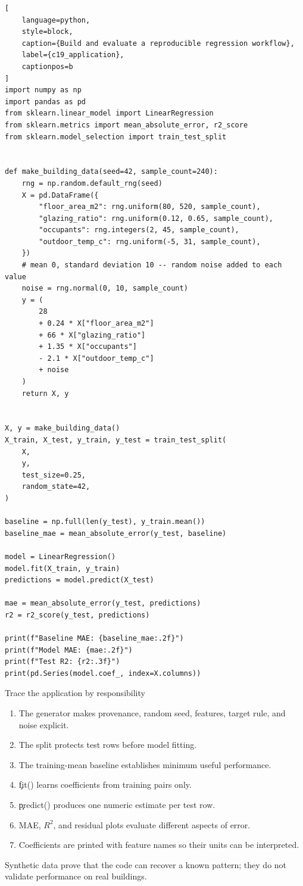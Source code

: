 \begin{lstlisting}[
    language=python,
    style=block,
    caption={Build and evaluate a reproducible regression workflow},
    label={c19_application},
    captionpos=b
]
import numpy as np
import pandas as pd
from sklearn.linear_model import LinearRegression
from sklearn.metrics import mean_absolute_error, r2_score
from sklearn.model_selection import train_test_split


def make_building_data(seed=42, sample_count=240):
    rng = np.random.default_rng(seed)
    X = pd.DataFrame({
        "floor_area_m2": rng.uniform(80, 520, sample_count),
        "glazing_ratio": rng.uniform(0.12, 0.65, sample_count),
        "occupants": rng.integers(2, 45, sample_count),
        "outdoor_temp_c": rng.uniform(-5, 31, sample_count),
    })
    # mean 0, standard deviation 10 -- random noise added to each value
    noise = rng.normal(0, 10, sample_count)
    y = (
        28
        + 0.24 * X["floor_area_m2"]
        + 66 * X["glazing_ratio"]
        + 1.35 * X["occupants"]
        - 2.1 * X["outdoor_temp_c"]
        + noise
    )
    return X, y


X, y = make_building_data()
X_train, X_test, y_train, y_test = train_test_split(
    X,
    y,
    test_size=0.25,
    random_state=42,
)

baseline = np.full(len(y_test), y_train.mean())
baseline_mae = mean_absolute_error(y_test, baseline)

model = LinearRegression()
model.fit(X_train, y_train)
predictions = model.predict(X_test)

mae = mean_absolute_error(y_test, predictions)
r2 = r2_score(y_test, predictions)

print(f"Baseline MAE: {baseline_mae:.2f}")
print(f"Model MAE: {mae:.2f}")
print(f"Test R2: {r2:.3f}")
print(pd.Series(model.coef_, index=X.columns))
\end{lstlisting}

\begin{SyntaxBox}{Trace the application by responsibility}
\begin{enumerate}
    \item The generator makes provenance, random seed, features, target rule,
          and noise explicit.
    \item The split protects test rows before model fitting.
    \item The training-mean baseline establishes minimum useful performance.
    \item \c{fit()} learns coefficients from training pairs only.
    \item \c{predict()} produces one numeric estimate per test row.
    \item MAE, $R^2$, and residual plots evaluate different aspects of error.
    \item Coefficients are printed with feature names so their units can be interpreted.
\end{enumerate}
Synthetic data prove that the code can recover a known pattern; they do not
validate performance on real buildings.
\end{SyntaxBox}

